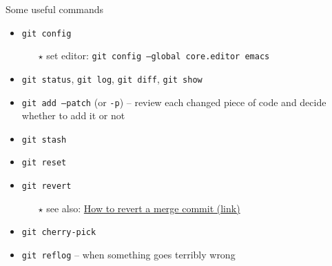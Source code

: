 \documentclass{beamer}
\begin{document}
    \begin{frame}{Some useful commands}

        \begin{itemize}
            \item \texttt{git config}
                \begin{itemize}
                    \item[$\star$] set editor: \texttt{git config --global core.editor emacs}
                \end{itemize}
            \item \texttt{git status}, \texttt{git log}, \texttt{git diff}, \texttt{git show}
            \item \texttt{git add --patch} (or \texttt{-p}) -- review each changed piece of code and decide whether to add it or not
            \item \texttt{git stash}
            \item \texttt{git reset}
            \item \texttt{git revert}
            \begin{itemize}
                \item[$\star$] see also: \href{https://stackoverflow.com/q/7099833/4744341}{How to revert a merge commit (link)}
            \end{itemize}
            \item \texttt{git cherry-pick}
            \item \texttt{git reflog} -- when something goes terribly wrong
        \end{itemize}

    \end{frame}
\end{document}
